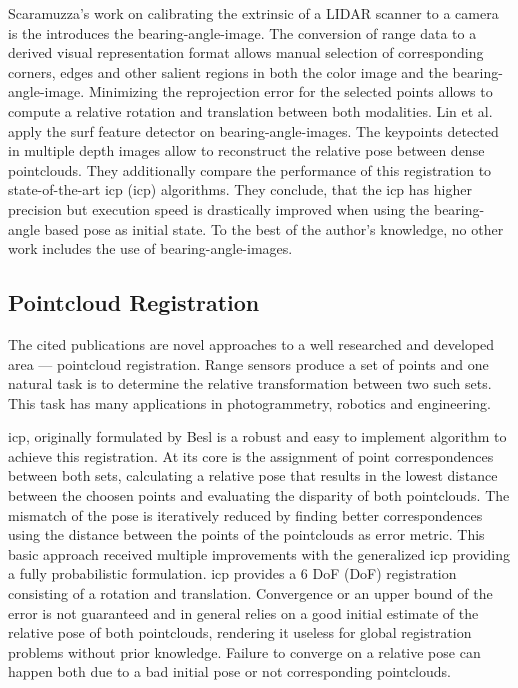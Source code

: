 Scaramuzza's\cite{scaramuzza_iros2007} work on calibrating the extrinsic of a \acrshort{LIDAR} scanner to a camera is the introduces the \gls{bearing-angle-image}.
The conversion of range data to a derived visual representation format allows manual selection of corresponding corners, edges and other salient regions in both the color image and the \gls{bearing-angle-image}.
Minimizing the reprojection error for the selected points allows to compute a relative rotation and translation between both modalities.
Lin et al.\cite{lin_easp2017} apply the \acrshort{surf}\cite{bay_eccv06} feature detector on \glspl{bearing-angle-image}.
The keypoints detected in multiple depth images allow to reconstruct the relative pose between dense pointclouds.
They additionally compare the performance of this registration to state-of-the-art \acrshort{icp} (\acrlong{icp}) algorithms.
They conclude, that the \acrshort{icp} has higher precision but execution speed is drastically improved when using the \gls{bearing-angle} based pose as initial state.
To the best of the author's knowledge, no other work includes the use of \glspl{bearing-angle-image}.

\subsection{Pointcloud Registration}

The cited publications are novel approaches to a well researched and developed area --- pointcloud registration.
Range sensors produce a set of points and one natural task is to determine the relative transformation between two such sets.
This task has many applications in photogrammetry, robotics and engineering.

\acrshort{icp}, originally formulated by Besl\cite{besl_pami1992} is a robust and easy to implement algorithm to achieve this registration.
At its core is the assignment of point correspondences between both sets, calculating a relative pose that results in the lowest distance between the choosen points and evaluating the disparity of both pointclouds.
The mismatch of the pose is iteratively reduced by finding better correspondences using the distance between the points of the pointclouds as error metric.
This basic approach received multiple improvements with the generalized \acrshort{icp}\cite{segal_2009,korn_2014} providing a fully probabilistic formulation.
\acrshort{icp} provides a 6 \acrlong{DoF} (\acrshort{DoF}) registration consisting of a rotation and translation.
Convergence or an upper bound of the error is not guaranteed and in general relies on a good initial estimate of the relative pose of both pointclouds, rendering it useless for global registration problems without prior knowledge.
Failure to converge on a relative pose can happen both due to a bad initial pose or not corresponding pointclouds.

